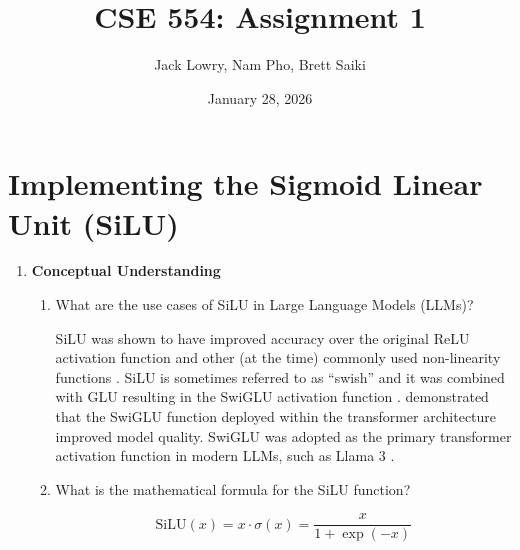 \documentclass[12pt]{article}
\title{CSE 554: Assignment 1}
\author{Jack Lowry, Nam Pho, Brett Saiki}
\date{January 28, 2026}
\begin{document}
\pagestyle{fancy}

\fancyhead{} %

\fancyfoot{} %
\fancyfoot[CO]{\thepage}

\maketitle

\section{Implementing the Sigmoid Linear Unit (SiLU)}

\begin{enumerate}[label=\textbf{Q\arabic*.}]
    \item \textbf{Conceptual Understanding}
    \begin{enumerate}
        \item What are the use cases of SiLU in Large Language Models (LLMs)?

        SiLU was shown to have improved accuracy over the original ReLU activation function and other (at the time) commonly used non-linearity functions \cite{silu}. SiLU is sometimes referred to as ``swish'' and it was combined with GLU resulting in the SwiGLU activation function \cite{swiglu}. \citeauthor{swiglu} demonstrated that the SwiGLU function deployed within the transformer architecture improved model quality. SwiGLU was adopted as the primary transformer activation function in modern LLMs, such as Llama 3 \cite{llama3}.


        \item What is the mathematical formula for the SiLU function?

        \begin{equation}
            \text{SiLU}\left(x\right) = x \cdot \sigma\left(x\right) = \frac{x}{1 + \exp\left(-x\right)}
        \end{equation}
    \end{enumerate}


\end{enumerate}
\end{document}
